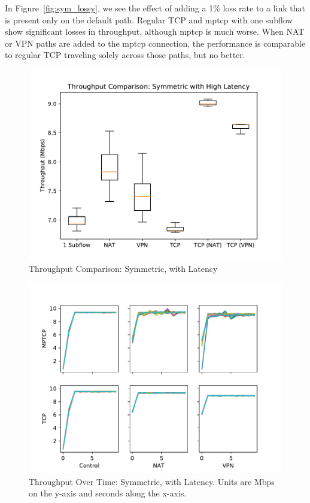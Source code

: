 \documentclass{cwru}
\begin{document}
In Figure~\ref{fig:sym_lossy}, we see the effect of adding a 1\% loss rate to
a link that is present only on the default path. Regular TCP and \ac{mptcp} with
one subflow show significant losses in throughput, although \ac{mptcp} is much
worse. When NAT or VPN paths are added to the \ac{mptcp} connection, the
performance is comparable to regular TCP traveling solely across those paths,
but no better.

\begin{figure}[p]
  \centering
  \includegraphics[height=0.42\textheight]{figures/sym_delayed.pdf}
  \caption{Throughput Comparison: Symmetric, with Latency}
  \label{fig:sym_delayed}
\end{figure}

\begin{figure}[p]
  \centering
  \includegraphics[height=0.42\textheight]{figures/timegrid_sym_delayed.pdf}
  \caption[Throughput Over Time: Symmetric, with Latency]{Throughput Over Time:
    Symmetric, with Latency. Units are Mbps on the y-axis and seconds along the
    x-axis.}
  \label{fig:timegrid_sym_delayed}
\end{figure}
\end{document}
